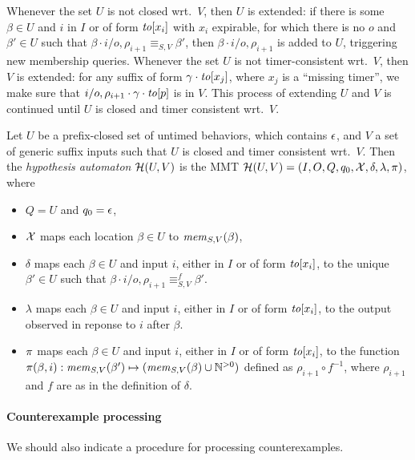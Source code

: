 Whenever the set $U$ is not closed wrt.\ $V$, then $U$ is extended:
if there is some $\beta \in U$ and $i$ in $I$ or of form $\toevent{x_i}$ with
$x_i$ expirable, for which there is no $o$ and $\beta' \in U$ such that
$\beta \cdot i/o,\rho_{i+1} \equiv_{S,V} \beta'$, 
then $\beta \cdot i/o,\rho_{i+1}$ is added to $U$,
triggering new membership queries.
Whenever the set $U$ is not timer-consistent wrt.\ $V$, then $V$ is extended:
for any suffix of form $\gamma \cdot \toevent{x_j}$, where
$x_j$ is a ``missing timer'', we make sure that $i/o,\rho_{i+1} \cdot \gamma \cdot \toevent{p}$ is in $V$.
    This process of
    extending $U$ and $V$ is continued until $U$ is closed
    and timer consistent wrt.\ $V$.

\begin{definition}
  Let $U$ be a prefix-closed set
  of untimed behaviors, which contains $\emptyword$,
  and $V$ a set of generic suffix inputs such that
$U$ is closed and timer consistent wrt.\ $V$. Then the
{\em hypothesis automaton} $\hypoof UV$ is the MMT
$\hypoof UV = (I, O, Q, q_0, \vars, \delta, \lambda, \remap)$, where
\begin{itemize}
\item $Q = U$ and $q_0 = \emptyword$,
\item $\vars$ maps each location $\beta\in U$ to $\getmemorable{S}{\beta}{V}$,
\item $\delta$ maps each $\beta \in U$ and input
  $i$, either in $I$ or of form $\toevent{x_i}$,
  to the unique $\beta' \in U$ such that
$\beta \cdot i/o,\rho_{i+1} \equiv_{S,V}^f \beta'$.
\item $\lambda$ maps each $\beta \in U$ and input
  $i$, either in $I$ or of form $\toevent{x_i}$, to the output observed in
  reponse to $i$ after $\beta$.
\item $\remap$
 maps each $\beta \in U$ and input
$i$, either in $I$ or of form $\toevent{x_i}$, to the function
  $\remap(\beta,i):\getmemorable{S}{\beta'}{V} \mapsto (\getmemorable{S}{\beta}{V} \cup \natplus)$ defined as $\rho_{i+1} \circ f^{-1}$, where $\rho_{i+1}$ and $f$
  are as in the definition of $\delta$.
\end{itemize}
\end{definition}

\paragraph{Counterexample processing}
We should also indicate a procedure for processing counterexamples.
